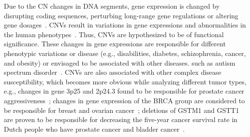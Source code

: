 \hspace*{3.5mm} Due to the CN changes in DNA segments, gene expression is changed by disrupting coding sequences, perturbing long-range gene regulations or altering gene dosages~\cite{37Yang}. CNVs result in variations in gene expressions and abnormalities in the human phenotypes~\cite{18Chen}. Thus, CNVs are hypothesized to be of functional significance. These changes in gene expressions are responsible for different phenotypic variations or disease (e.g., disabilities, diabetes, schizophrenia, cancer, and obesity) or envisaged to be associated with other diseases. such as autism spectrum disorder~\cite{38Buckland, 39Nguyen, 40McCarroll}. CNVs are also associated with other complex disease susceptibility, which becomes more obvious while analyzing different tumor types, e.g., changes in gene 3p25 and 2p24.3 found to be responsible for prostate cancer aggressiveness~\cite{43Liu, 44Thean}; changes in gene expression of the BRCA group are considered to be responsible for breast and ovarian cancer~\cite{45Petrij, 46Montagna}; deletions of GSTM1 and GSTT1 are proven to be responsible for decreasing the five-year cancer survival rate in Dutch people who have prostate cancer and bladder cancer~\cite{48Diskin, 31Park}.\\

